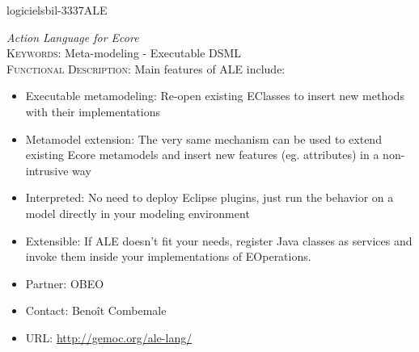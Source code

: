 \documentclass{ra2018}
\begin{document}
 \begin{module}{logiciels}{bil-3337}{ALE}

 \textit{Action Language for Ecore} \\ 


   \textsc{Keywords:} Meta-modeling - Executable DSML \\ 


   

 \textsc{Functional Description:}  Main features of ALE include:

\begin{itemize}
	\item Executable metamodeling: Re-open existing EClasses to insert new methods with their implementations
	\item Metamodel extension: The very same mechanism can be used to extend existing Ecore metamodels and insert new features (eg. attributes) in a non-intrusive way
	\item Interpreted: No need to deploy Eclipse plugins, just run the behavior on a model directly in your modeling environment
	\item Extensible: If ALE doesn’t fit your needs, register Java classes as services and invoke them inside your implementations of EOperations.
\end{itemize}


   \begin{itemize}
      \item Partner: OBEO
      \item Contact: Benoît Combemale
      \item URL: \url{http://gemoc.org/ale-lang/}
   \end{itemize}

 \end{module}
\end{document}
